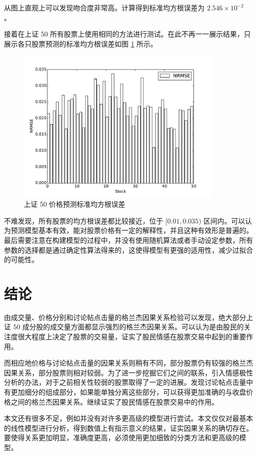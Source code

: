 从图上直观上可以发现吻合度非常高。计算得到标准均方根误差为 $2.546\times 10^{-2}$ 。

接着在上证 50 所有股票上使用相同的方法进行测试。在此不再一一展示结果，只展示各只股票预测的标准均方根误差如图 \ref{price_prediction:2} 所示。

\begin{figure}
  \centering
  \includegraphics[width=0.9\textwidth]{plots/positive_click_count_forecast_price_on_sse_50.pdf}
  \caption{上证 50 价格预测标准均方根误差}
  \label{price_prediction:2}
\end{figure}

不难发现，所有股票的均方根误差都比较接近，位于 $[0.01,0.035)$ 区间内。可以认为预测模型基本有效，能对股票价格有一定的解释性，并且这种有效形是普遍的。最后需要注意在构建模型的过程中，并没有使用随机算法或者手动设定参数，所有参数的选择都是通过确定性算法得来的，这使得模型有更强的适用性，减少过拟合的可能性。

\chapter{结论}

由成交量、价格分别和讨论帖点击量的格兰杰因果关系检验可以发现，绝大部分上证 50 成分股的成交量方面都显示强烈的格兰杰因果关系。可以认为是由股民的关注度很大程度上决定了股票的交易量，证实了股民情感在股票交易中起到的重要作用。

而相应地价格与讨论帖点击量的因果关系则稍有不同，部分股票仍有较强的格兰杰因果关系，部分股票则相对较弱。为了进一步挖掘它们之间的联系，引入情感极性分析的办法，对于之前相关性较弱的股票取得了一定的进展。发现讨论帖点击量中有更加细分的组成部分，如果能单独分离这些部分，可以获得更加准确的与收盘价格之间的格兰杰因果关系。继续证实了股民情感在股票交易中的作用。

本文还有很多不足，例如并没有对许多更高级的模型进行尝试。本文仅仅对最基本的线性模型进行分析，得到数值上有指示意义的结果，证实因果关系的确切存在。要使得关系更加明显，准确度更高，必须使用更加细致的分类方法和更高级的模型。

